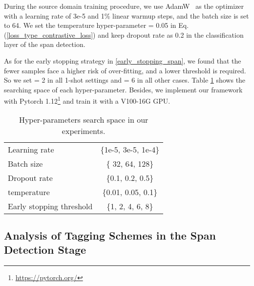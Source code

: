 \documentclass[11pt]{article}
\begin{document}
During the source domain training procedure, we use AdamW~\cite{loshchilov2018decoupled} as the optimizer with a learning rate of 3e-5 and 1\% linear warmup steps, and the batch size is set to 64. We set the temperature hyper-parameter  = 0.05 in Eq.(\ref{loss_type_contrastive_loss}) and keep dropout rate as 0.2 in the classification layer of the span detection.

As for the early stopping strategy in \ref{early_stopping_span}, we found that the fewer samples face a higher risk of over-fitting, and a lower  threshold is required. So we set  = 2 in all 1-shot settings and  = 6 in all other cases.
Table \ref{tab:hyper-parameters} shows the searching space of each hyper-parameter. Besides, we implement our framework with Pytorch 1.12\footnote{\url{https://pytorch.org/}} and train it with a V100-16G GPU.

\begin{table}[htb]
    \centering
    \small
    {
        \begin{tabular}{lc}
        \toprule
            Learning rate & \{1e-5, 3e-5, 1e-4\} \\
            Batch size & \{ 32, 64, 128\} \\ 
            Dropout rate & \{0.1, 0.2, 0.5\} \\
            temperature  & \{0.01, 0.05, 0.1\} \\
            Early stopping threshold  & \{1, 2, 4, 6, 8\} \\
         \bottomrule
        \end{tabular}
    }
    \caption{Hyper-parameters search space in our experiments.}
    \vspace{-3mm}
    \label{tab:hyper-parameters}
\end{table}










\subsection{Analysis of Tagging Schemes in the Span Detection Stage}\label{appendix_results_span_detection}
\end{document}
